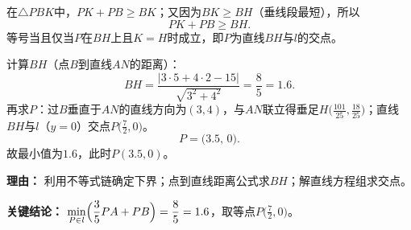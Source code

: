 \begin{examplebox}
\begin{description}[style=nextline, leftmargin=2.8em, labelsep=0.5em, itemsep=0.45em]
		\item[\textbf{第三步（求最值）：}]
			在$\triangle PBK$中，$PK+PB \ge BK$；又因为$BK \ge BH$（垂线段最短），所以
			\[
				PK+PB \ge BH.
			\]
			等号当且仅当$P$在$BH$上且$K=H$时成立，即$P$为直线$BH$与$l$的交点。\par
			计算$BH$（点$B$到直线$AN$的距离）：
			\[
				BH = \frac{|3\cdot5+4\cdot2-15|}{\sqrt{3^2+4^2}} = \frac{8}{5}=1.6.
			\]
			再求$P$：过$B$垂直于$AN$的直线方向为$(3,4)$，与$AN$联立得垂足$H\bigl(\frac{101}{25},\frac{18}{25}\bigr)$；直线$BH$与$l$（$y=0$）交点$P\bigl(\frac72,0\bigr)$。
			\[
				P = \bigl(3.5,\,0\bigr).
			\]
			故最小值为$1.6$，此时$P(3.5,0)$。
			\par\textbf{理由：} 利用不等式链确定下界；点到直线距离公式求$BH$；解直线方程组求交点。
	\end{description}

	\textbf{\textcolor{CExample}{关键结论：}}
	$\displaystyle\min_{P\in l}\Bigl(\frac35PA+PB\Bigr)=\frac85 = 1.6$，取等点$P\bigl(\frac72,0\bigr)$。
\end{examplebox}
